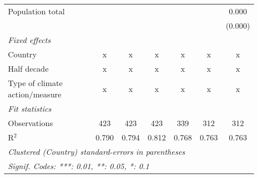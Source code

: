 \begin{tabular}{lcccccc}
   Population total                                                     &         &              &                &                &                & 0.000\\   
                                                                        &         &              &                &                &                & (0.000)\\   
   \emph{Fixed effects}\\
   Country                                                              & x       & x            & x              & x              & x              & x\\  
   Half decade                                                          & x       & x            & x              & x              & x              & x\\  
   Type of climate action/measure                                       & x       & x            & x              & x              & x              & x\\  
   \midrule \emph{Fit statistics}\\
   Observations                                                         & 423     & 423          & 423            & 339            & 312            & 312\\  
   R$^2$                                                                & 0.790   & 0.794        & 0.812          & 0.768          & 0.763          & 0.763\\  
   \midrule
   \multicolumn{7}{l}{\emph{Clustered (Country) standard-errors in parentheses}}\\
   \multicolumn{7}{l}{\emph{Signif. Codes: ***: 0.01, **: 0.05, *: 0.1}}\\
\end{tabular}
\par\endgroup


